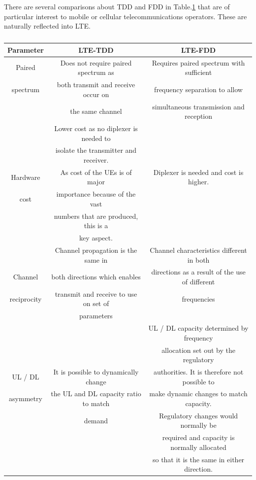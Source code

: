 \documentclass[conference]{IEEEtran}
\begin{document}
There are several comparisons about TDD and FDD in Table.\ref{table:comparisons_about_TDD_and_FDD} that are of particular interest to mobile or cellular telecommunications operators. These are naturally reflected into LTE.

\begin{table}[htbp]
	\centering
	\caption{}\label{table:comparisons_about_TDD_and_FDD}
	\begin{tabular}{c c c}
		\hline \hline
		Parameter & LTE-TDD & LTE-FDD \\
		\hline
		Paired&Does not require paired spectrum as&Requires paired spectrum with sufficient\\
		spectrum&both transmit and receive occur on&frequency separation to allow\\
		&the same channel&simultaneous transmission and reception\\
		\hline
		&Lower cost as no diplexer is needed to &\\
		&isolate the transmitter and receiver. &\\
		Hardware &As cost of the UEs is of major &Diplexer is needed and cost is higher.\\
		cost&importance because of the vast &\\
		&numbers that are produced, this is a &\\
		&key aspect.&\\
		\hline
		&Channel propagation is the same in &Channel characteristics different in both \\
		Channel &both directions which enables &directions as a result of the use of different \\
		reciprocity&transmit and receive to use on set of &frequencies\\
		&parameters&\\
		\hline
		&&UL / DL capacity determined by frequency \\
		&&allocation set out by the regulatory \\
		UL / DL &It is possible to dynamically change&authorities. It is therefore not possible to  \\
		asymmetry&the UL and DL capacity ratio to match &make dynamic changes to match capacity. \\
		&demand&Regulatory changes would normally be \\
		&&required and capacity is normally allocated \\
		&&so that it is the same in either direction.\\

\end{tabular}
\end{table}
\end{document}
